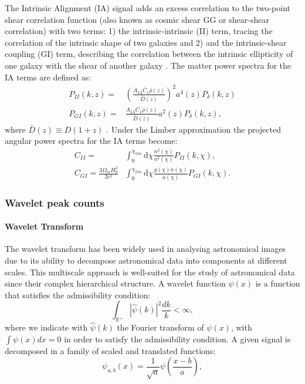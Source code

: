 \documentclass{aa}
\begin{document}
The Intrinsic Alignment (IA) signal adds an excess correlation to the two-point shear correlation function (also known as cosmic shear GG or shear-shear correlation) with two terms: 1) the intrinsic-intrinsic (II) term, tracing the correlation of the intrinsic shape of two galaxies  and 2) and the intrinsic-shear coupling (GI) term, describing the correlation between the intrinsic ellipticity of one galaxy with the shear of another galaxy \citep{kilbinger2015cosmology}.
The matter power spectra for the IA terms are defined as:
\begin{align}
    P_{II}(k,z)=& \left ( \frac{A_{IA}\bar{C}_1\bar{\rho}(z)}{\bar{D}(z)} \right)^2 a^{4}(z)P_{\delta}(k,z) 
    \\
    P_{GI}(k,z)=&  \frac{A_{IA}\bar{C}_1\bar{\rho}(z)}{\bar{D}(z)} a^{2}(z)P_{\delta}(k,z),
\end{align}
where $\bar{D}(z) \equiv D(1+z)$ \citep{harnois2021cosmic}.
Under the Limber
approximation the projected angular power spectra for the IA terms become:
\begin{align}
    C_{II}=& \int_0^{\chi_{lim}} \text{d}\chi 
    \frac{n^2(\chi)}{a^2(\chi)}P_{II}(k,\chi), \\
    C_{GI}= \frac{3\Omega_m H_0^2}{2c^2} & \int_0^{\chi_{lim}} \text{d}\chi 
    \frac{g(\chi)n(\chi)}{a(\chi)}P_{GI}(k,\chi).
\end{align}



\subsubsection{Wavelet peak counts}
\paragraph{Wavelet Transform} The wavelet transform has been widely used in analysing astronomical images due to its ability to decompose astronomical data into components at different scales. 
This multiscale approach is well-suited for the study of astronomical data since their complex hierarchical structure. A wavelet function $\psi(x)$ is a function that satisfies the admissibility condition:
\begin{equation}
    \int_{\mathbb{R}^{+}} |\hat{\psi}(k)|^2 \frac{dk}{k}<\infty,
\end{equation}
where we indicate with $\hat{\psi}(k)$ the Fourier transform of $\psi(x)$, with $\int\psi(x)dx=0$ in order to satisfy the admissibility condition. 
A given signal is decomposed in a family of scaled and translated functions:
\begin{equation}
    \psi_{a,b}(x)=\frac{1}{\sqrt{a}}\psi \left( \frac{x-b}{a}\right),
\end{equation}
\end{document}
